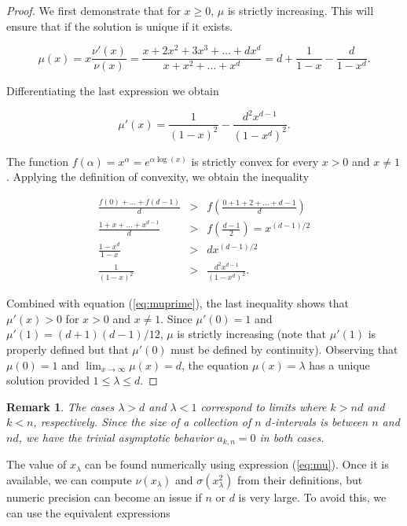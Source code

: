 \documentclass{article}
\newtheorem*{remark}{Remark}
\begin{document}
\begin{proof}
We first demonstrate that for $x \geq 0$, $\mu$ is strictly increasing.
This will ensure that if the solution is unique if it exists.

\begin{equation}
\label{eq:mu}
\mu(x) = x\frac{\nu'(x)}{\nu(x)} =
\frac{x+2x^2+3x^3+\ldots+dx^d}{x+x^2+\ldots+x^d} =
d+\frac{1}{1-x} - \frac{d}{1-x^d}.
\end{equation} 

Differentiating the last expression we obtain

\begin{equation}
\label{eq:muprime}
\mu'(x) = \frac{1}{(1-x)^2} -\frac{d^2x^{d-1}}{(1-x^d)^2}.
\end{equation}

The function $f(\alpha) = x^{\alpha} = e^{\alpha \log(x)}$ is strictly
convex for every $x > 0$ and $x \neq 1$. Applying the definition of
convexity, we obtain the inequality

\begin{eqnarray*}
\frac{f(0)+\ldots+f(d-1)}{d} &>&
f\left(\frac{0+1+2+\ldots+d-1}{d}\right) \\
\frac{1+x+\ldots+x^{d-1}}{d} &>& f\left(\frac{d-1}{2}\right)
= x^{(d-1)/2} \\
\frac{1-x^d}{1-x} &>& dx^{(d-1)/2} \\
\frac{1}{(1-x)^2} &>& \frac{d^2x^{d-1}}{(1-x^d)^2}.
\end{eqnarray*}

Combined with equation (\ref{eq:muprime}), the last inequality shows that
$\mu'(x) > 0$ for $x > 0$ and $x \neq 1$. Since $\mu'(0) = 1$ and $\mu'(1)
= (d+1)(d-1)/12$, $\mu$ is strictly increasing (note that $\mu'(1)$ is
properly defined but that $\mu'(0)$ must be defined by continuity).
Observing that $\mu(0) = 1$ and $\lim_{x\rightarrow\infty} \mu(x) = d$,
the equation $\mu(x) = \lambda$ has a unique solution provided $1 \leq
\lambda \leq d$.
\end{proof}

\begin{remark}
The cases $\lambda > d$ and $\lambda < 1$ correspond to limits where $k >
nd$ and $k < n$, respectively. Since the size of a collection of $n$
$d$-intervals is between $n$ and $nd$, we have the trivial asymptotic
behavior $a_{k,n} = 0$ in both cases.
\end{remark}


The value of $x_\lambda$ can be found numerically using expression
(\ref{eq:mu}).  Once it is available, we can compute $\nu(x_\lambda)$ and
$\sigma(x_\lambda^2)$ from their definitions, but numeric precision can
become an issue if $n$ or $d$ is very large. To avoid this, we can use the
equivalent expressions
\end{document}
